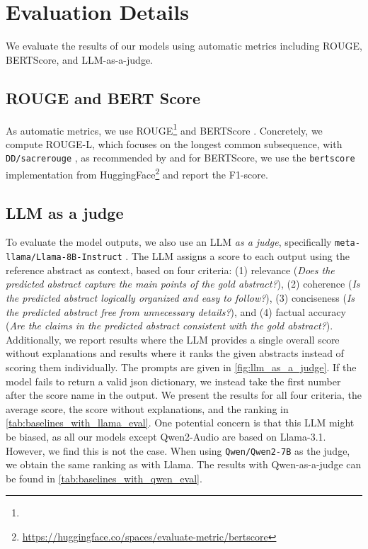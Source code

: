 \section{Evaluation Details}
We evaluate the results of our models using automatic metrics including ROUGE, BERTScore, and LLM-as-a-judge.
\subsection{ROUGE and BERT Score}
As automatic metrics, we use ROUGE\footnote{} \citep{lin-2004-rouge} and BERTScore  \citep{DBLP:conf/iclr/ZhangKWWA20}. Concretely, we compute ROUGE-L, which focuses on the longest common subsequence, with \texttt{DD/sacrerouge} \citep{deutsch-roth-2020-sacrerouge}, as recommended by \citet{grusky-2023-rogue} and for BERTScore, we use the \texttt{bertscore} implementation from HuggingFace\footnote{\url{https://huggingface.co/spaces/evaluate-metric/bertscore}} and report the F1-score.


\subsection{LLM as a judge}\label{sec:app-llm-as-a-judge}
To evaluate the model outputs, we also use an LLM \textit{as a judge}, specifically \texttt{meta\--llama/\-Llama\--8B\--Instruct}  \citep{dubey2024llama3herdmodels}. The LLM assigns a score to each output using the reference abstract as context, based on four criteria: (1) relevance (\textit{Does the predicted abstract capture the main points of the gold abstract?}), (2) coherence (\textit{Is the predicted abstract logically organized and easy to follow?}), (3) conciseness (\textit{Is the predicted abstract free from unnecessary details?}), and (4) factual accuracy (\textit{Are the claims in the predicted abstract consistent with the gold abstract?}). Additionally, we report results where the LLM provides a single overall score without explanations and results where it ranks the given abstracts instead of scoring them individually. The prompts are given in \cref{fig:llm_as_a_judge}.
If the model fails to return a valid json dictionary, we instead take the first number after the score name in the output. 
We present the results for all four criteria, the average score, the score without explanations, and the ranking in \cref{tab:baselines_with_llama_eval}.  One potential concern is that this LLM might be biased, as all our models except Qwen2-Audio are based on Llama-3.1. However, we find this is not the case. When using \texttt{Qwen/Qwen2-7B} \citep{yang2024qwen2technicalreport} as the judge, we obtain the same ranking as with Llama. The results with Qwen-as-a-judge can be found in \cref{tab:baselines_with_qwen_eval}.



